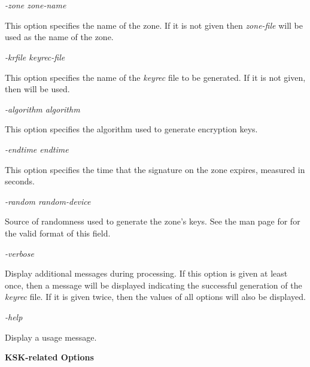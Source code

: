 \begin{description}

\item {\it -zone zone-name}\verb" "

This option specifies the name of the zone.  If it is not given then
{\it zone-file} will be used as the name of the zone.

\item {\it -krfile keyrec-file}\verb" "

This option specifies the name of the {\it keyrec} file to be generated.
If it is not given, then  will be used.

\item {\it -algorithm algorithm}\verb" "

This option specifies the algorithm used to generate encryption keys.

\item {\it -endtime endtime}\verb" "

This option specifies the time that the signature on the zone expires,
measured in seconds.

\item {\it -random random-device}\verb" "

Source of randomness used to generate the zone's keys. See the man
page for  for the valid format of this field.

\item {\it -verbose}\verb" "

Display additional messages during processing.  If this option is given at
least once, then a message will be displayed indicating the successful
generation of the {\it keyrec} file.  If it is given twice, then the values
of all options will also be displayed.

\item {\it -help}\verb" "

Display a usage message.

\end{description}

{\bf KSK-related Options}

